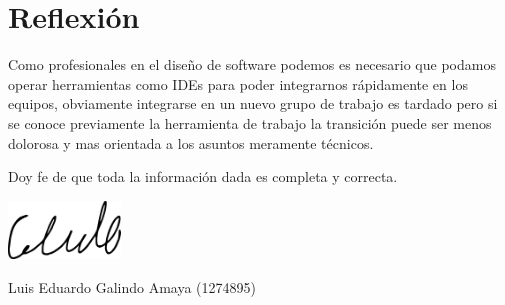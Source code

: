 \documentclass[12pt]{article}
\begin{document}
\section*{Reflexión}
\label{sec:org4bbdfc9}
\begin{mdframed}
Como profesionales en el diseño de software podemos es necesario que podamos operar herramientas como IDEs para poder integrarnos rápidamente en los equipos, obviamente integrarse en un nuevo grupo de trabajo es tardado pero si se conoce previamente la herramienta de trabajo la transición puede ser menos dolorosa y mas orientada a los asuntos meramente técnicos.
\end{mdframed}

\begin{center}
Doy fe de que toda la información dada es  completa y correcta. \\
\begin{center}
\includegraphics[width=3cm]{../includes/firma.png}
\end{center}
Luis Eduardo Galindo Amaya (1274895)
\end{center}
\end{document}

